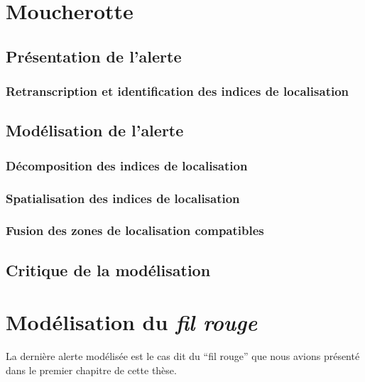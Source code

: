 \section{Moucherotte}
\label{sec:9-2}

\subsection{Présentation de l'alerte}
\label{subsec:9-2-1}

\subsubsection{Retranscription et identification des indices de localisation}
\label{subsec:9-2-1-1}

\subsection{Modélisation de l'alerte}
\label{subsec:9-2-2}

\subsubsection{Décomposition des indices de localisation}
\label{subsec:9-2-2-2}

\subsubsection{Spatialisation des indices de localisation}
\label{subsec:9-2-2-3}

\subsubsection{Fusion des zones de localisation compatibles}
\label{subsec:9-2-2-4}

\subsection{Critique de la modélisation}
\label{subsec:9-2-3}




\section{Modélisation du \emph{fil rouge}}
\label{sec:9-3}

La dernière alerte modélisée est le cas dit du \enquote{fil rouge} que
nous avions présenté dans le premier chapitre de cette thèse.

